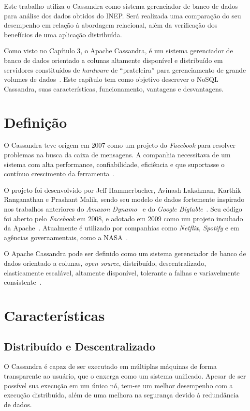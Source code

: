 Este trabalho utiliza o Cassandra como sistema gerenciador de banco de dados para análise dos dados obtidos do INEP. Será realizada uma comparação do seu desempenho em relação à abordagem relacional, além da verificação dos benefícios de uma aplicação distribuída.

Como visto no Capítulo 3, o Apache Cassandra, é um sistema gerenciador de banco de dados orientado a colunas altamente disponível e distribuído em servidores constituídos de \emph{hardware} de \enquote{prateleira} para gerenciamento de grande volumes de dados~\cite{lakshmancassandra}. Este capítulo tem como objetivo descrever o NoSQL Cassandra, suas características, funcionamento, vantagens e desvantagens.

\section{Definição}
O Cassandra teve origem em 2007 como um projeto do \emph{Facebook} para resolver problemas na busca da caixa de mensagens. A companhia necessitava de um sistema com alta performance, confiabilidade, eficiência e que suportasse o contínuo crescimento da ferramenta~\cite{lakshmancassandra}. 

O projeto foi desenvolvido por Jeff Hammerbacher, Avinash Lakshman, Karthik Ranganathan e Prashant Malik, sendo seu modelo de dados fortemente inspirado nos trabalhos anteriores do \emph{Amazon Dynamo}~\cite{dynamo} e do \emph{Google Bigtable}~\cite{bigtable}. Seu código foi aberto pelo \emph{Facebook} em 2008, e adotado em 2009 como um projeto incubado da Apache~\cite{cassandraguide}. Atualmente é utilizado por companhias como \emph{Netflix}, \emph{Spotify} e em agências governamentais, como a NASA~\cite{cassandracompanies}. 

O Apache Cassandra pode ser definido como um sistema gerenciador de banco de dados orientado a colunas, \emph{open source}, distribuído, descentralizado, elasticamente escalável, altamente disponível, tolerante a falhas e variavelmente consistente~\cite{cassandraguide}.


\section{Características}

\subsection*{Distribuído e Descentralizado}
O Cassandra é capaz de ser executado em múltiplas máquinas de forma transparente ao usuário, que o enxerga como um sistema unificado. Apesar de ser possível sua execução em um único nó, tem-se um melhor desempenho com a execução distribuída, além de uma melhora na segurança devido à redundância de dados.

